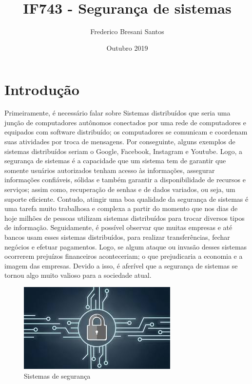 \documentclass[a4paper, 10pt]{article}
\title{IF743 - Segurança de sistemas}
\author{Frederico Bresani Santos}
\date{Outubro 2019}
\begin{document}
\maketitle

\section{Introdução}
Primeiramente, é necessário falar sobre Sistemas distribuídos que seria uma junção de computadores autônomos conectados por uma rede de computadores e equipados com software distribuído; os computadores se comunicam e coordenam suas atividades por troca de mensagens. Por conseguinte, alguns exemplos de sistemas distribuídos seriam o Google, Facebook, Instagram e Youtube.
Logo, a segurança de sistemas é a capacidade que um sistema tem de garantir que somente usuários autorizados tenham acesso às informações, assegurar informações confiáveis, sólidas e também garantir a disponibilidade de recursos e serviços; assim como, recuperação de senhas e de dados variados, ou seja, um suporte eficiente. Contudo, atingir uma boa qualidade da segurança de sistemas é uma tarefa muito trabalhosa e complexa a partir do momento que nos dias de hoje milhões de pessoas utilizam sistemas distribuídos para trocar diversos tipos de informação.
Seguidamente, é possível observar que muitas empresas e até bancos usam esses sistemas distribuídos, para realizar transferências, fechar negócios e efetuar pagamentos. Logo, se algum ataque ou invasão desses sistemas ocorrerem prejuízos financeiros aconteceriam; o que prejudicaria a economia e a imagem das empresas. Devido a isso, é aferível que a segurança de sistemas se tornou algo muito valioso para a sociedade atual.
\citep{enterocistoma}



\begin{figure}[h!]
\centering
\includegraphics[scale=0.9]{ss.jpg}
\caption{Sistemas de segurança \citep{imagemSeguranca}}
\label{fig:ss}
\end{figure}
\end{document}

